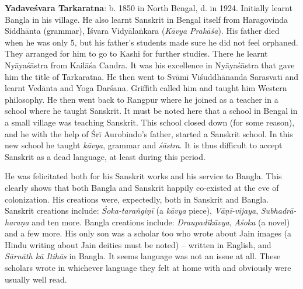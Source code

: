\textbf{Yadaveśvara Tarkaratna}: b. 1850 in North Bengal, d. in 1924. Initially learnt Bangla in his village. He also learnt Sanskrit in Bengal itself from Haragovinda Siddhānta (grammar), Īśvara Vidyālaṅkara (\textit{Kāvya Prakāśa}). His father died when he was only 5, but his father’s students made sure he did not feel orphaned. They arranged for him to go to Kashi for further studies. There he learnt Nyāyaśāstra from Kailāśa Candra. It was his excellence in Nyāyaśāstra that gave him the title of Tarkaratna. He then went to Svāmī Viśuddhānanda Sarasvatī and learnt Vedānta and Yoga Darśana. Griffith called him and taught him Western philosophy. He then went back to Rangpur where he joined as a teacher in a school where he taught Sanskrit. It must be noted here that a school in Bengal in a small village was teaching Sanskrit. This school closed down (for some reason), and he with the help of Śrī Aurobindo’s father, started a Sanskrit school. In this new school he taught \textit{kāvya}, grammar and \textit{śāstra}. It is thus difficult to accept Sanskrit as a dead language, at least during this period.

He was felicitated both for his Sanskrit works and his service to Bangla. This clearly shows that both Bangla and Sanskrit happily co-existed at the eve of colonization. His creations were, expectedly, both in Sanskrit and Bangla. Sanskrit creations include: \textit{Śoka-taraṅgiṇī} (a \textit{kāvya} piece), \textit{Vāṇī-vijaya}, \textit{Subhadrā-haraṇa} and ten more. Bangla creations include: \textit{Draupadīkāvya}, \textit{Aśoka} (a novel) and a few more. His only son was a scholar too who wrote about Jain images (a Hindu writing about Jain deities must be noted) – written in English, and \textit{Sārnāth kā Itihās} in Bangla. It seems language was not an issue at all. These scholars wrote in whichever language they felt at home with and obviously were usually well read.

